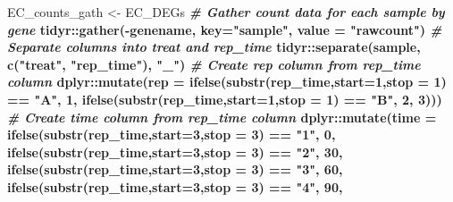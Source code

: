 \documentclass[]{article}
\newenvironment{Shaded}{\begin{snugshade}}{\end{snugshade}}
\newcommand{\KeywordTok}[1]{\textcolor[rgb]{0.13,0.29,0.53}{\textbf{#1}}}
\newcommand{\DataTypeTok}[1]{\textcolor[rgb]{0.13,0.29,0.53}{#1}}
\newcommand{\DecValTok}[1]{\textcolor[rgb]{0.00,0.00,0.81}{#1}}
\newcommand{\StringTok}[1]{\textcolor[rgb]{0.31,0.60,0.02}{#1}}
\newcommand{\CommentTok}[1]{\textcolor[rgb]{0.56,0.35,0.01}{\textit{#1}}}
\newcommand{\OperatorTok}[1]{\textcolor[rgb]{0.81,0.36,0.00}{\textbf{#1}}}
\newcommand{\NormalTok}[1]{#1}
\begin{document}
\begin{Shaded}
\begin{Highlighting}[]
\NormalTok{EC_counts_gath <-}\StringTok{ }\NormalTok{EC_DEGs }\OperatorTok{%
\StringTok{  }\CommentTok{# Gather count data for each sample by gene}
\StringTok{  }\NormalTok{tidyr}\OperatorTok{::}\KeywordTok{gather}\NormalTok{(}\OperatorTok{-}\NormalTok{genename, }\DataTypeTok{key=}\StringTok{"sample"}\NormalTok{, }\DataTypeTok{value =} \StringTok{"rawcount"}\NormalTok{) }\OperatorTok{%
\StringTok{  }\CommentTok{# Separate columns into treat and rep_time}
\StringTok{  }\NormalTok{tidyr}\OperatorTok{::}\KeywordTok{separate}\NormalTok{(sample, }\KeywordTok{c}\NormalTok{(}\StringTok{"treat"}\NormalTok{, }\StringTok{"rep_time"}\NormalTok{), }\StringTok{"_"}\NormalTok{) }\OperatorTok{%
\StringTok{  }\CommentTok{# Create rep column from rep_time column}
\StringTok{  }\NormalTok{dplyr}\OperatorTok{::}\KeywordTok{mutate}\NormalTok{(}\DataTypeTok{rep =} \KeywordTok{ifelse}\NormalTok{(}\KeywordTok{substr}\NormalTok{(rep_time,}\DataTypeTok{start=}\DecValTok{1}\NormalTok{,}\DataTypeTok{stop =} \DecValTok{1}\NormalTok{) }\OperatorTok{==}\StringTok{ "A"}\NormalTok{, }\DecValTok{1}\NormalTok{, }
                        \KeywordTok{ifelse}\NormalTok{(}\KeywordTok{substr}\NormalTok{(rep_time,}\DataTypeTok{start=}\DecValTok{1}\NormalTok{,}\DataTypeTok{stop =} \DecValTok{1}\NormalTok{) }\OperatorTok{==}\StringTok{ "B"}\NormalTok{, }\DecValTok{2}\NormalTok{, }\DecValTok{3}\NormalTok{))) }\OperatorTok{%
\StringTok{  }\CommentTok{# Create time column from rep_time column}
\StringTok{  }\NormalTok{dplyr}\OperatorTok{::}\KeywordTok{mutate}\NormalTok{(}\DataTypeTok{time =} \KeywordTok{ifelse}\NormalTok{(}\KeywordTok{substr}\NormalTok{(rep_time,}\DataTypeTok{start=}\DecValTok{3}\NormalTok{,}\DataTypeTok{stop =} \DecValTok{3}\NormalTok{) }\OperatorTok{==}\StringTok{ "1"}\NormalTok{, }\DecValTok{0}\NormalTok{,}
                      \KeywordTok{ifelse}\NormalTok{(}\KeywordTok{substr}\NormalTok{(rep_time,}\DataTypeTok{start=}\DecValTok{3}\NormalTok{,}\DataTypeTok{stop =} \DecValTok{3}\NormalTok{) }\OperatorTok{==}\StringTok{ "2"}\NormalTok{, }\DecValTok{30}\NormalTok{,}
                             \KeywordTok{ifelse}\NormalTok{(}\KeywordTok{substr}\NormalTok{(rep_time,}\DataTypeTok{start=}\DecValTok{3}\NormalTok{,}\DataTypeTok{stop =} \DecValTok{3}\NormalTok{) }\OperatorTok{==}\StringTok{ "3"}\NormalTok{, }\DecValTok{60}\NormalTok{,}
                                    \KeywordTok{ifelse}\NormalTok{(}\KeywordTok{substr}\NormalTok{(rep_time,}\DataTypeTok{start=}\DecValTok{3}\NormalTok{,}\DataTypeTok{stop =} \DecValTok{3}\NormalTok{) }\OperatorTok{==}\StringTok{ "4"}\NormalTok{, }\DecValTok{90}\NormalTok{,}
}}}}
\end{Highlighting}
\end{Shaded}
\end{document}
